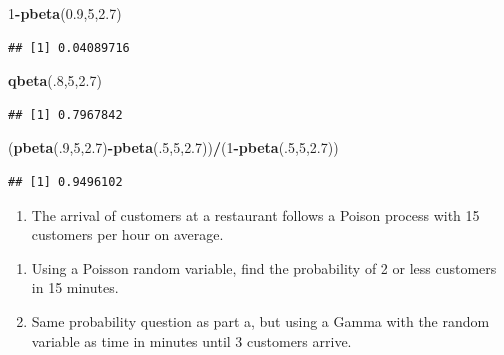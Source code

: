 \documentclass[]{book}
\newenvironment{Shaded}{\begin{snugshade}}{\end{snugshade}}
\newcommand{\KeywordTok}[1]{\textcolor[rgb]{0.13,0.29,0.53}{\textbf{#1}}}
\newcommand{\DecValTok}[1]{\textcolor[rgb]{0.00,0.00,0.81}{#1}}
\newcommand{\FloatTok}[1]{\textcolor[rgb]{0.00,0.00,0.81}{#1}}
\newcommand{\OperatorTok}[1]{\textcolor[rgb]{0.81,0.36,0.00}{\textbf{#1}}}
\newcommand{\NormalTok}[1]{#1}
\providecommand{\tightlist}{%
  \setlength{\itemsep}{0pt}\setlength{\parskip}{0pt}}
\theoremstyle{definition}
\theoremstyle{definition}
\theoremstyle{definition}
\theoremstyle{remark}
\begin{document}
\begin{Shaded}
\begin{Highlighting}[]
\DecValTok{1}\OperatorTok{-}\KeywordTok{pbeta}\NormalTok{(}\FloatTok{0.9}\NormalTok{,}\DecValTok{5}\NormalTok{,}\FloatTok{2.7}\NormalTok{)}
\end{Highlighting}
\end{Shaded}

\begin{verbatim}
## [1] 0.04089716
\end{verbatim}

\begin{Shaded}
\begin{Highlighting}[]
\KeywordTok{qbeta}\NormalTok{(.}\DecValTok{8}\NormalTok{,}\DecValTok{5}\NormalTok{,}\FloatTok{2.7}\NormalTok{)}
\end{Highlighting}
\end{Shaded}

\begin{verbatim}
## [1] 0.7967842
\end{verbatim}

\begin{Shaded}
\begin{Highlighting}[]
\NormalTok{(}\KeywordTok{pbeta}\NormalTok{(.}\DecValTok{9}\NormalTok{,}\DecValTok{5}\NormalTok{,}\FloatTok{2.7}\NormalTok{)}\OperatorTok{-}\KeywordTok{pbeta}\NormalTok{(.}\DecValTok{5}\NormalTok{,}\DecValTok{5}\NormalTok{,}\FloatTok{2.7}\NormalTok{))}\OperatorTok{/}\NormalTok{(}\DecValTok{1}\OperatorTok{-}\KeywordTok{pbeta}\NormalTok{(.}\DecValTok{5}\NormalTok{,}\DecValTok{5}\NormalTok{,}\FloatTok{2.7}\NormalTok{))}
\end{Highlighting}
\end{Shaded}

\begin{verbatim}
## [1] 0.9496102
\end{verbatim}

\begin{enumerate}
\def\labelenumi{\arabic{enumi})}
\setcounter{enumi}{2}
\tightlist
\item
  The arrival of customers at a restaurant follows a Poison process with
  15 customers per hour on average.
\end{enumerate}

\begin{enumerate}
\def\labelenumi{\alph{enumi})}
\tightlist
\item
  Using a Poisson random variable, find the probability of 2 or less
  customers in 15 minutes.
\item
  Same probability question as part a, but using a Gamma with the random
  variable as time in minutes until 3 customers arrive.
\end{enumerate}
\end{document}
